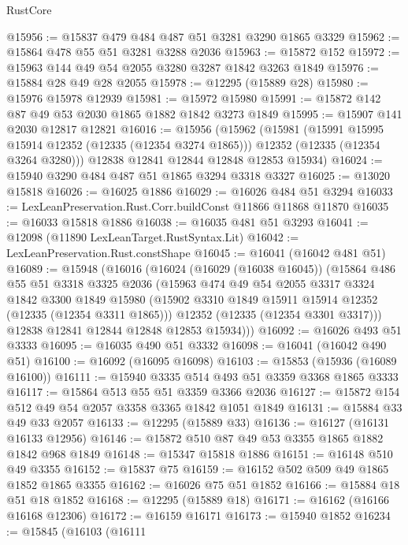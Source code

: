 \begin{lexlean}{RustCore}
\begin{coremodule}
@15956 := @15837 @479 @484 @487 @51 @3281 @3290 @1865 @3329
@15962 := @15864 @478 @55 @51 @3281 @3288 @2036
@15963 := @15872 @152
@15972 := @15963 @144 @49 @54 @2055 @3280 @3287 @1842 @3263 @1849
@15976 := @15884 @28 @49 @28 @2055
@15978 := @12295 (@15889 @28)
@15980 := @15976 @15978 @12939
@15981 := @15972 @15980
@15991 := @15872 @142 @87 @49 @53 @2030 @1865 @1882 @1842 @3273 @1849
@15995 := @15907 @141 @2030 @12817 @12821
@16016 := @15956
    (@15962
      (@15981
        (@15991 @15995 @15914 @12352 (@12335 (@12354 @3274 @1865)))
        @12352
        (@12335 (@12354 @3264 @3280)))
      @12838
      @12841
      @12844
      @12848
      @12853
      @15934)
@16024 := @15940 @3290 @484 @487 @51 @1865 @3294 @3318 @3327
@16025 := @13020 @15818
@16026 := @16025 @1886
@16029 := @16026 @484 @51 @3294
@16033 := LexLeanPreservation.Rust.Corr.buildConst @11866 @11868 @11870
@16035 := @16033 @15818 @1886
@16038 := @16035 @481 @51 @3293
@16041 := @12098 (@11890 LexLeanTarget.RustSyntax.Lit)
@16042 := LexLeanPreservation.Rust.constShape
@16045 := @16041 (@16042 @481 @51)
@16089 := @15948
    (@16016
      (@16024
        (@16029 (@16038 @16045))
        (@15864
          @486
          @55
          @51
          @3318
          @3325
          @2036
          (@15963
            @474
            @49
            @54
            @2055
            @3317
            @3324
            @1842
            @3300
            @1849
            @15980
            (@15902 @3310 @1849 @15911 @15914 @12352 (@12335 (@12354 @3311 @1865)))
            @12352
            (@12335 (@12354 @3301 @3317)))
          @12838
          @12841
          @12844
          @12848
          @12853
          @15934)))
@16092 := @16026 @493 @51 @3333
@16095 := @16035 @490 @51 @3332
@16098 := @16041 (@16042 @490 @51)
@16100 := @16092 (@16095 @16098)
@16103 := @15853 (@15936 (@16089 @16100))
@16111 := @15940 @3335 @514 @493 @51 @3359 @3368 @1865 @3333
@16117 := @15864 @513 @55 @51 @3359 @3366 @2036
@16127 := @15872 @154 @512 @49 @54 @2057 @3358 @3365 @1842 @1051 @1849
@16131 := @15884 @33 @49 @33 @2057
@16133 := @12295 (@15889 @33)
@16136 := @16127 (@16131 @16133 @12956)
@16146 := @15872 @510 @87 @49 @53 @3355 @1865 @1882 @1842 @968 @1849
@16148 := @15347 @15818 @1886
@16151 := @16148 @510 @49 @3355
@16152 := @15837 @75
@16159 := @16152 @502 @509 @49 @1865 @1852 @1865 @3355
@16162 := @16026 @75 @51 @1852
@16166 := @15884 @18 @51 @18 @1852
@16168 := @12295 (@15889 @18)
@16171 := @16162 (@16166 @16168 @12306)
@16172 := @16159 @16171
@16173 := @15940 @1852
@16234 := @15845
    (@16103
      (@16111

\end{coremodule}
\end{lexlean}
